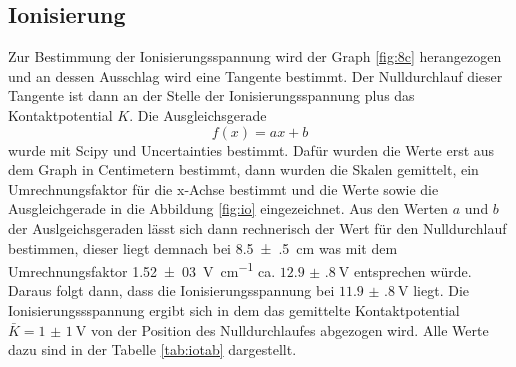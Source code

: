 \subsection{Ionisierung}
Zur Bestimmung der Ionisierungsspannung wird der Graph \ref{fig:8c} herangezogen und
an dessen Ausschlag wird eine Tangente bestimmt. Der Nulldurchlauf dieser Tangente
ist dann an der Stelle der Ionisierungsspannung plus das Kontaktpotential $K$. Die Ausgleichsgerade
\begin{equation*}
  f(x) = ax + b
\end{equation*}
wurde mit Scipy \cite{scipy} und Uncertainties \cite{uncertainties} bestimmt.
Dafür wurden die Werte erst aus dem Graph in Centimetern bestimmt, dann wurden
die Skalen gemittelt, ein Umrechnungsfaktor für die x-Achse bestimmt und die Werte
sowie die Ausgleichgerade in die Abbildung \ref{fig:io} eingezeichnet. Aus den
Werten $a$ und $b$ der Auslgeichsgeraden lässt sich dann rechnerisch der Wert
für den Nulldurchlauf bestimmen, dieser liegt demnach bei \SI{8.5(5)}{\centi \meter} was mit dem Umrechnungsfaktor
\SI{1,52(03)}{\volt \per \centi \meter} ca. $\SI{12.9(8)}{\volt}$ entsprechen würde.
Daraus folgt dann, dass die Ionisierungsspannung bei $\SI{11.9(8)}{\volt}$
liegt. Die Ionisierungssspannung ergibt sich in dem das gemittelte Kontaktpotential
$ \bar{K} = \SI{1(1)}{\volt} $ von der Position des Nulldurchlaufes abgezogen wird.
Alle Werte dazu sind in der Tabelle \ref{tab:iotab} dargestellt.
